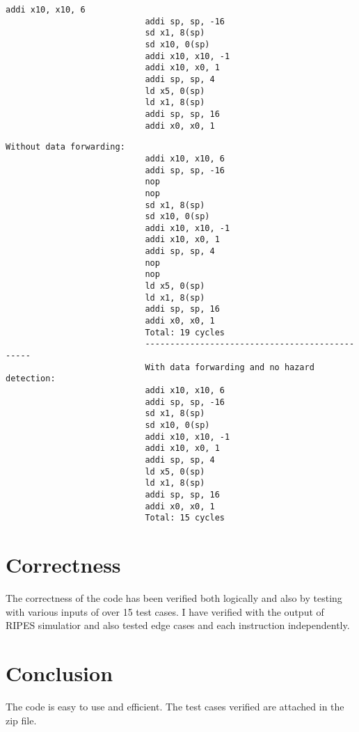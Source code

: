 \documentclass{article}
\begin{document}
\begin{lstlisting}[caption=Sample Input]
                            addi x10, x10, 6
                            addi sp, sp, -16
                            sd x1, 8(sp)
                            sd x10, 0(sp)
                            addi x10, x10, -1
                            addi x10, x0, 1
                            addi sp, sp, 4
                            ld x5, 0(sp)
                            ld x1, 8(sp)
                            addi sp, sp, 16
                            addi x0, x0, 1
\end{lstlisting}
\begin{lstlisting}[caption=Sample output]
                            Without data forwarding: 
                            addi x10, x10, 6
                            addi sp, sp, -16
                            nop
                            nop
                            sd x1, 8(sp)
                            sd x10, 0(sp)
                            addi x10, x10, -1
                            addi x10, x0, 1
                            addi sp, sp, 4
                            nop
                            nop
                            ld x5, 0(sp)
                            ld x1, 8(sp)
                            addi sp, sp, 16
                            addi x0, x0, 1
                            Total: 19 cycles
                            -----------------------------------------------
                            With data forwarding and no hazard detection: 
                            addi x10, x10, 6
                            addi sp, sp, -16
                            sd x1, 8(sp)
                            sd x10, 0(sp)
                            addi x10, x10, -1
                            addi x10, x0, 1
                            addi sp, sp, 4
                            ld x5, 0(sp)
                            ld x1, 8(sp)
                            addi sp, sp, 16
                            addi x0, x0, 1
                            Total: 15 cycles
\end{lstlisting}
\section{Correctness}
The correctness of the code has been verified both logically and also by testing with various inputs of over 15 test cases. I have verified with the output of RIPES simulatior and also tested edge cases and each instruction independently.

\section{Conclusion}
The code is easy to use and efficient. The test cases verified are attached in the zip file.
\end{document}
